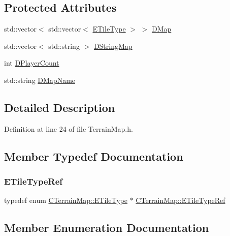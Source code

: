 \subsection*{Protected Attributes}
\begin{DoxyCompactItemize}
\item 
std\+::vector$<$ std\+::vector$<$ \hyperlink{classCTerrainMap_aff2ab991e237269941416dd79d8871d4}{E\+Tile\+Type} $>$ $>$ \hyperlink{classCTerrainMap_a80d154ce478948b10473534a7bca13f6}{D\+Map}
\item 
std\+::vector$<$ std\+::string $>$ \hyperlink{classCTerrainMap_a76db5fd05e22e0aea413f49175f9c282}{D\+String\+Map}
\item 
int \hyperlink{classCTerrainMap_a79e2cf566ac9dfbaddd2c73ea256785b}{D\+Player\+Count}
\item 
std\+::string \hyperlink{classCTerrainMap_a9026e4a5f073885b9e9fc3b43e93caa6}{D\+Map\+Name}
\end{DoxyCompactItemize}


\subsection{Detailed Description}


Definition at line 24 of file Terrain\+Map.\+h.



\subsection{Member Typedef Documentation}
\hypertarget{classCTerrainMap_a817b5c0c7f75205946ef7d0a2f49642e}{}\label{classCTerrainMap_a817b5c0c7f75205946ef7d0a2f49642e} 
\subsubsection{\texorpdfstring{E\+Tile\+Type\+Ref}{ETileTypeRef}}
{\footnotesize\ttfamily typedef  enum \hyperlink{classCTerrainMap_aff2ab991e237269941416dd79d8871d4}{C\+Terrain\+Map\+::\+E\+Tile\+Type} $\ast$ \hyperlink{classCTerrainMap_a817b5c0c7f75205946ef7d0a2f49642e}{C\+Terrain\+Map\+::\+E\+Tile\+Type\+Ref}}



\subsection{Member Enumeration Documentation}
\hypertarget{classCTerrainMap_aff2ab991e237269941416dd79d8871d4}{}\label{classCTerrainMap_aff2ab991e237269941416dd79d8871d4} 
